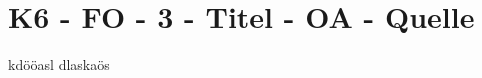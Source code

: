 \section{K6 - FO - 3 - Titel - OA - Quelle}

\begin{beispiel}[FO (6.)]{1}
kdööasl dlaskaös
\end{beispiel}